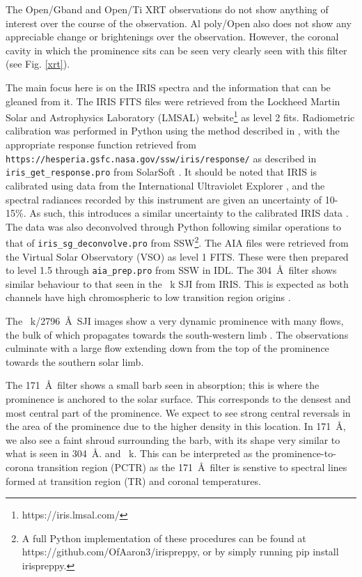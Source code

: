 The Open/Gband and Open/Ti XRT observations do not show anything of interest over the course of the observation. Al poly/Open also does not show any appreciable change or brightenings over the observation. However, the coronal cavity in which the prominence sits can be seen very clearly seen with this filter (see Fig. \ref{xrt}).

The main focus here is on the IRIS spectra and the information that can be gleaned from it. The IRIS FITS files were retrieved from the Lockheed Martin Solar and Astrophysics Laboratory (LMSAL) website\footnote{https://iris.lmsal.com/} as level 2 fits. Radiometric calibration was performed in Python using the method described in \cite{pereira_itn_2018}, with the appropriate response function retrieved from \texttt{https://hesperia.gsfc.nasa.gov/ssw/iris/response/} as described in \texttt{iris\_get\_response.pro} from SolarSoft \citep[SSW; ][]{freeland_data_1998}. It should be noted that IRIS is calibrated using data from the International Ultraviolet Explorer \citep[IUE;][]{bogges_IUE_1978}, and the spectral radiances recorded by this instrument are given an uncertainty of 10-15\%. As such, this introduces a similar uncertainty to the calibrated IRIS data \citep{tian_itn_2014}. The data was also deconvolved through Python following similar operations to that of \texttt{iris\_sg\_deconvolve.pro} from SSW\footnote{A full Python implementation of these procedures can be found at https://github.com/OfAaron3/irispreppy, or by simply running pip install irispreppy.}. The AIA files were retrieved from the Virtual Solar Observatory (VSO) as level 1 FITS. These were then prepared to level 1.5 through \texttt{aia\_prep.pro} from SSW in IDL. The 304~\AA\ filter shows similar behaviour to that seen in the \mgii~k SJI from IRIS. This is expected as both channels have high chromospheric to low transition region origins \citep{lemen_atmospheric_2012, depontieu_interface_2014}. 

The \mgii~k/2796~\AA\ SJI images show a very dynamic prominence with many flows, the bulk of which propagates towards the south-western limb . The observations culminate with a large flow extending down from the top of the prominence towards the southern solar limb.

The 171~\AA\ filter shows a small barb seen in absorption; this is where the prominence is anchored to the solar surface. This corresponds to the densest and most central part of the prominence. We expect to see strong central reversals in the area of the prominence due to the higher density in this location. In 171~\AA, we also see a faint shroud surrounding the barb, with its shape very similar to what is seen in 304~\AA. and \mgii~k. This can be interpreted as the prominence-to-corona transition region (PCTR) as the 171~\AA\ filter is senstive to spectral lines formed at transition region (TR) and coronal temperatures.

